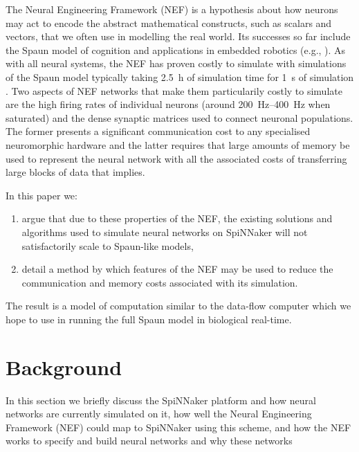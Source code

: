 \documentclass[conference]{IEEEtran}
\begin{document}
  The Neural Engineering Framework (NEF) \parencite{Eliasmith2004} is a
  hypothesis about how neurons may act to encode the abstract mathematical
  constructs, such as scalars and vectors, that we often use in modelling the
  real world. Its successes so far include the Spaun model of cognition
  \parencite{Eliasmith2012} and applications in embedded robotics (e.g.,
  \parencite{Stewart2015ip}). As with all neural systems, the NEF has proven
  costly to simulate with simulations of the Spaun model typically taking
  \SI{2.5}{\hour} of simulation time for \SI{1}{\second} of simulation
  \parencite[\S V]{Stewart2014}. Two aspects of NEF networks that make them 
  particularily costly to simulate are the high firing rates of individual 
  neurons (around \SIrange{200}{400}{\hertz} when saturated) and the dense 
  synaptic matrices used to connect neuronal populations. The former 
  presents a significant communication cost to any specialised neuromorphic 
  hardware and the latter requires that large amounts of memory be used to 
  represent the neural network with all the associated costs of transferring 
  large blocks of data that implies.

  In this paper we:
  \begin{enumerate}
    \item argue that due to these properties of the NEF, the
      existing solutions and algorithms used to simulate neural networks on
      SpiNNaker will not satisfactorily scale to Spaun-like models,
    \item detail a method by which features of the NEF may be used to reduce
      the communication and memory costs associated with its simulation.
      
  \end{enumerate}

  The result is a model of computation similar to the data-flow computer which
  we hope to use in running the full Spaun model in biological real-time.

  \section{Background}

  In this section we briefly discuss the SpiNNaker platform and how neural
  networks are currently simulated on it, how well the Neural Engineering
  Framework (NEF) could map to SpiNNaker using this scheme, and how the NEF
  works to specify and build neural networks and why these networks
\end{document}
